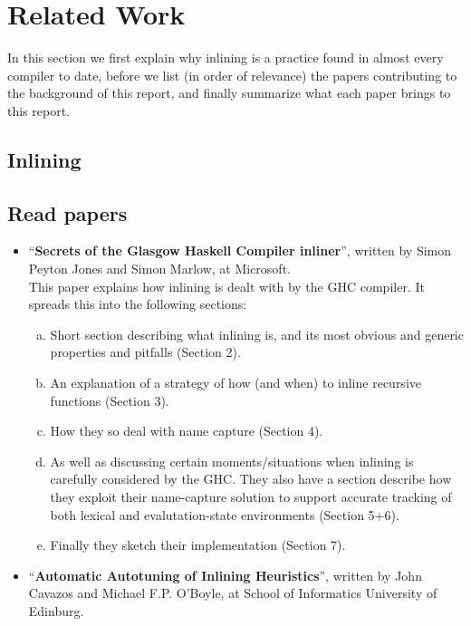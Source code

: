 
\section{Related Work}

In this section we first explain why inlining is a practice found in almost
every compiler to date, before we list (in order of relevance) the
papers contributing to the background of this report, and finally summarize what
each paper brings to this report.

\subsection{Inlining}

\subsection{Read papers}

\begin{itemize}
	\item ``\textbf{Secrets of the Glasgow Haskell Compiler inliner}'', written
by Simon Peyton Jones and Simon Marlow, at Microsoft. \\

This paper explains how inlining is dealt with by the GHC compiler. It spreads
this into the following sections:
\begin{enumerate}[a)]
	\item Short section describing what inlining is, and its most obvious and
generic properties and pitfalls (Section 2).
	\item An explanation of a strategy of how (and when) to inline recursive
functions (Section 3).
	\item How they so deal with name capture (Section 4).
	\item As well as discussing certain moments/situations when inlining is
carefully considered by the GHC. They also have a section describe how they
exploit their name-capture solution to support accurate tracking of both lexical
and evalutation-state environments (Section 5+6).
	\item Finally they sketch their implementation (Section 7).
\end{enumerate}

	\item ``\textbf{Automatic Autotuning of Inlining Heuristics}'', written by
John Cavazos and Michael F.P. O'Boyle, at School of Informatics University of
Edinburg. \\

\end{itemize}
